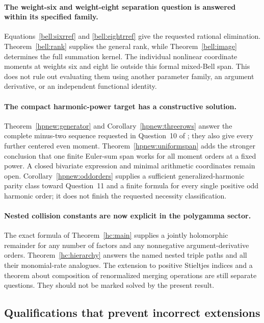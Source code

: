 \paragraph{The weight-six and weight-eight separation question is answered
within its specified family.}
Equations~\eqref{bell:sixrref} and \eqref{bell:eightrref} give the
requested rational elimination. Theorem~\ref{bell:rank} supplies the
general rank, while Theorem~\ref{bell:image} determines the full
summation kernel. The individual nonlinear coordinate moments at
weights six and eight lie outside this formal mixed-Bell span.
This does not rule out evaluating them using another parameter family,
an argument derivative, or an independent functional identity.

\paragraph{The compact harmonic-power target has a constructive solution.}
Theorem~\ref{hpnew:generator} and
Corollary~\ref{hpnew:threerows} answer the complete minus-two sequence
requested in Question~10 of \cite{RepoExactResonant}; they also give
every further centered even moment. Theorem~\ref{hpnew:uniformspan}
adds the stronger conclusion that one finite Euler-sum span works for
all moment orders at a fixed power. A closed bivariate expression and
minimal arithmetic coordinates remain open.
Corollary~\ref{hpnew:oddorders} supplies a sufficient generalized-harmonic
parity class toward Question~11 and a finite formula for every single
positive odd harmonic order; it does not finish the requested necessity
classification.

\paragraph{Nested collision constants are now explicit in the polygamma
sector.}
The exact formula of Theorem~\ref{hc:main} supplies a jointly
holomorphic remainder for any number of factors and any nonnegative
argument-derivative orders. Theorem~\ref{hc:hierarchy} answers the
named nested triple paths and all their monomial-rate analogues.
The extension to positive Stieltjes indices and a theorem about
composition of renormalized merging operations are still separate
questions. They should not be marked solved by the present result.

\subsection{Qualifications that prevent incorrect extensions}

